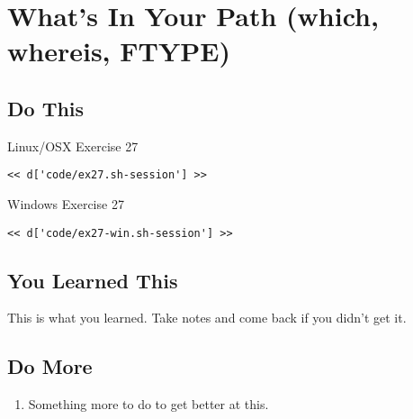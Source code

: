 \chapter{What's In Your Path (which, whereis, FTYPE)}

\section{Do This}

\begin{code}{Linux/OSX Exercise 27}
\begin{Verbatim}
<< d['code/ex27.sh-session'] >>
\end{Verbatim}
\end{code}

\begin{code}{Windows Exercise 27}
\begin{Verbatim}
<< d['code/ex27-win.sh-session'] >>
\end{Verbatim}
\end{code}

\section{You Learned This}

This is what you learned.  Take notes and come back if you didn't get it.

\section{Do More}

\begin{enumerate}
\item Something more to do to get better at this.
\end{enumerate}

